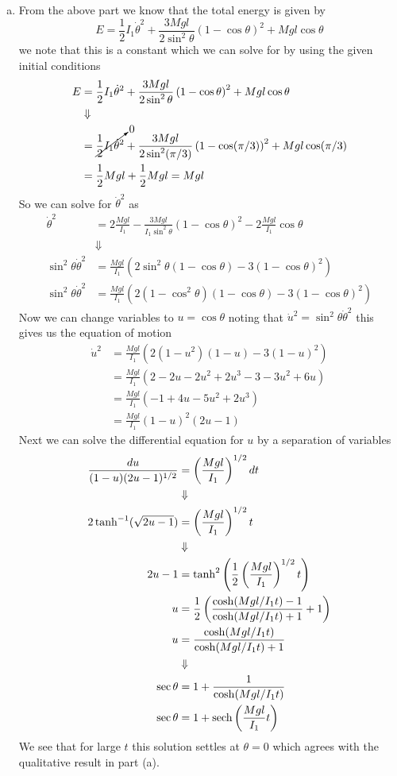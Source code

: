 \documentclass[11pt]{article}
\numberwithin{equation}{section}
\begin{document}
\begin{enumerate}[(a)]
\item From the above part we know that the total energy is given by
$$E =\frac{1}{2}I_1\dot{\theta}^2 + \frac{3Mgl}{2\sin^2\theta}\left(1-\cos\theta\right)^2 + Mgl\cos\theta$$  
we note that this is a constant which we can solve for by using the given initial conditions
\begin{align*}
E &= \frac{1}{2}I_1\dot{\theta}^2 + \frac{3Mgl}{2\sin^2\theta}\left(1-\cos\theta\right)^2 + Mgl\cos\theta\\
&\Downarrow\\
&= \cancelto{0}{\frac{1}{2}I_1\dot{\theta}^2} + \frac{3Mgl}{2\sin^2(\pi/3)}\left(1-\cos(\pi/3)\right)^2 + Mgl\cos(\pi/3)\\
&= \frac{1}{2}Mgl + \frac{1}{2}Mgl = Mgl
\end{align*}
So we can solve for $\dot{\theta}^2$ as
\begin{align*}
\dot{\theta}^2 &= 2\frac{Mgl}{I_1} - \frac{3Mgl}{I_1\sin^2\theta}\left(1-\cos\theta\right)^2 - 2\frac{Mgl}{I_1}\cos\theta\\
&\Downarrow\\
\sin^2\theta\dot{\theta}^2 &= \frac{Mgl}{I_1}\left(2\sin^2\theta(1-\cos\theta) - 3\left(1-\cos\theta\right)^2\right)\\
\sin^2\theta\dot{\theta}^2 &= \frac{Mgl}{I_1}\left(2(1-\cos^2\theta)(1-\cos\theta) - 3\left(1-\cos\theta\right)^2\right)
\end{align*}
Now we can change variables to $u=\cos\theta$ noting that $\dot{u}^2 = \sin^2\theta\dot{\theta}^2$
this gives us the equation of motion
\begin{align*}
\dot{u}^2 &= \frac{Mgl}{I_1}\left(2(1-u^2)(1-u) - 3\left(1-u\right)^2\right)\\
&= \frac{Mgl}{I_1}\left(2-2u-2u^2+2u^3-3-3u^2+6u\right)\\
&= \frac{Mgl}{I_1}\left(-1+4u-5u^2+2u^3\right)\\
&= \frac{Mgl}{I_1}(1-u)^2(2u-1)
\end{align*}
Next we can solve the differential equation for $u$ by a separation of variables 
\begin{align*}
\frac{du}{(1-u)(2u-1)^{1/2}} &= \left(\frac{Mgl}{I_1}\right)^{1/2}dt\\
&\Downarrow\\
2\tanh^{-1}(\sqrt{2u-1}) &= \left(\frac{Mgl}{I_1}\right)^{1/2}t\\
&\Downarrow\\
2u-1 &= \tanh^2\left(\frac{1}{2}\left(\frac{Mgl}{I_1}\right)^{1/2}t\right)\\
u &= \frac{1}{2}\left(\frac{\cosh(Mgl/I_1t)-1}{\cosh(Mgl/I_1t)+1}+1\right)\\
u &= \frac{\cosh(Mgl/I_1t)}{\cosh(Mgl/I_1t)+1}\\
&\Downarrow\\
\sec\theta &= 1 + \frac{1}{\cosh(Mgl/I_1t)}\\
\sec\theta &= 1 + \textnormal{sech}\left(\frac{Mgl}{I_1}t\right)
\end{align*}
We see that for large $t$ this solution settles at $\theta=0$ which agrees with the qualitative
result in part (a).
\end{enumerate}
\end{document}

